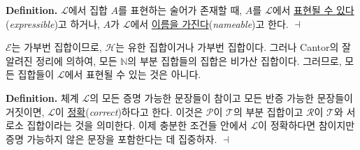 \documentclass[12pt]{paper}
\newenvironment{context}[1][]{\noindent \textbf{{#1}.}}{\hfill $ \dashv $}
\begin{document}
  \begin{context}[Definition]
    $\mathcal{L}$에서 집합 $A$를 표현하는 술어가 존재할 때,
    $A$를 $\mathcal{L}$에서 \underline{표현될 수 있다}(\textit{expressible})고 하거나,
    $A$가 $\mathcal{L}$에서 \underline{이름을 가진다}(\textit{nameable})고 한다.
  \end{context}

  $\mathcal{E}$는 가부번 집합이므로,
  $\mathcal{H}$는 유한 집합이거나 가부번 집합이다.
  그러나 Cantor의 잘 알려진 정리에 의하여,
  모든 $\mathbb{N}$의 부분 집합들의 집합은 비가산 집합이다.
  그러므로, 모든 집합들이 $\mathcal{L}$에서 표현될 수 있는 것은 아니다.
  
  \begin{context}[Definition]
    체계 $\mathcal{L}$의 모든 증명 가능한 문장들이 참이고 모든 반증 가능한 문장들이 거짓이면,
    $\mathcal{L}$이 \underline{정확}(\textit{correct})하다고 한다.
    이것은 $\mathcal{P}$이 $\mathcal{T}$의 부분 집합이고 $\mathcal{R}$이 $\mathcal{T}$와 서로소 집합이라는 것을 의미한다.
    이제 충분한 조건들 안에서 $\mathcal{L}$이 정확하다면 참이지만 증명 가능하지 않은 문장을 포함한다는 데 집중하자.
  \end{context}
\end{document}
